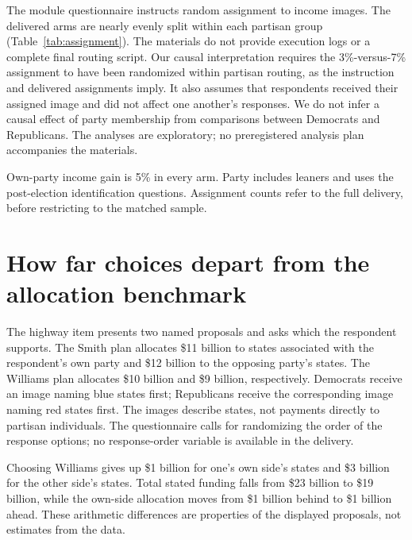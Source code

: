 \documentclass[11pt]{article}
\begin{document}
The module questionnaire instructs random assignment to income images. The delivered arms are nearly evenly split within each partisan group (Table~\ref{tab:assignment}). The materials do not provide execution logs or a complete final routing script. Our causal interpretation requires the 3\%-versus-7\% assignment to have been randomized within partisan routing, as the instruction and delivered assignments imply. It also assumes that respondents received their assigned image and did not affect one another's responses. We do not infer a causal effect of party membership from comparisons between Democrats and Republicans. The analyses are exploratory; no preregistered analysis plan accompanies the materials.

\begin{table}[!htbp]
\centering\small
\caption{Income experiment: assignment and response counts among partisans.}
\label{tab:assignment}

\begin{minipage}{\linewidth}\footnotesize
Own-party income gain is 5\% in every arm. Party includes leaners and uses the post-election identification questions. Assignment counts refer to the full delivery, before restricting to the matched sample.
\end{minipage}
\end{table}

\section{How far choices depart from the allocation benchmark}
The highway item presents two named proposals and asks which the respondent supports. The Smith plan allocates \$11 billion to states associated with the respondent's own party and \$12 billion to the opposing party's states. The Williams plan allocates \$10 billion and \$9 billion, respectively. Democrats receive an image naming blue states first; Republicans receive the corresponding image naming red states first. The images describe states, not payments directly to partisan individuals. The questionnaire calls for randomizing the order of the response options; no response-order variable is available in the delivery.

Choosing Williams gives up \$1 billion for one's own side's states and \$3 billion for the other side's states. Total stated funding falls from \$23 billion to \$19 billion, while the own-side allocation moves from \$1 billion behind to \$1 billion ahead. These arithmetic differences are properties of the displayed proposals, not estimates from the data.
\end{document}
